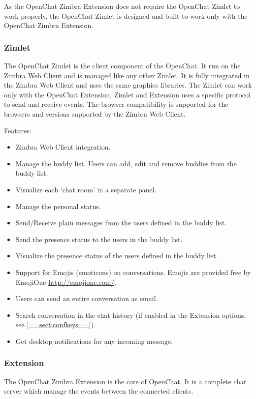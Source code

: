     As the OpenChat Zimbra Extension does not require the OpenChat Zimlet to work properly, the OpenChat Zimlet is designed
    and built to work only with the OpenChat Zimbra Extension.

\subsubsection{Zimlet}
    The OpenChat Zimlet is the client component of the OpenChat. It run on the Zimbra Web Client and is managed like any
    other Zimlet.
    It is fully integrated in the Zimbra Web Client and uses the same graphics libraries.
    The Zimlet can work only with the OpenChat Extension, Zimlet and Extension uses a specific protocol to send and receive
    events.
    The browser compatibility is supported for the browsers and versions supported by the Zimbra Web Client.

    Features:
    \begin{itemize}
        \item Zimbra Web Client integration.
        \item Manage the buddy list. Users can add, edit and remove buddies from the buddy list.
        \item Visualize each `chat room' in a separate panel.
        \item Manage the personal status.
        \item Send/Receive plain messages from the users defined in the buddy list.
        \item Send the presence status to the users in the buddy list.
        \item Visualize the presence status of the users defined in the buddy list.
        \item Support for Emojis (emoticons) on conversations. Emojis are provided free by EmojiOne \url{http://emojione.com/}.
        \item Users can send an entire conversation as email.
        \item Search conversation in the chat history (if enabled in the Extension options, see \ref{==sect:confkeys==}).
        \item Get desktop notifications for any incoming message.
    \end{itemize}

\subsubsection{Extension}
    The OpenChat Zimbra Extension is the core of OpenChat. It is a complete chat server which manage the events between
    the connected clients.


